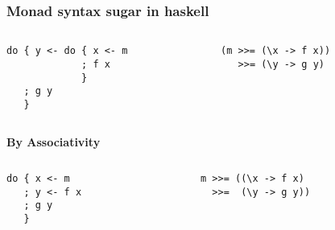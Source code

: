 \documentclass{beamer}
\begin{document}
\begin{frame}[fragile]
\frametitle{Monad syntax sugar in haskell}
\vspace{-0.5cm}
\begin{columns}[t]
  \begin{column}{5cm}
\begin{lstlisting}
do { y <- do { x <- m
             ; f x
             }
   ; g y 
   }
\end{lstlisting}
  \end{column}
  \begin{column}{5cm}
\begin{lstlisting}
(m >>= (\x -> f x)) 
   >>= (\y -> g y)
\end{lstlisting}
  \end{column}
\end{columns}

\pause

\begin{center}
\textbf{By Associativity}
\end{center}

\vspace{-0.5cm}
\begin{columns}[t]
  \begin{column}{5cm}
{
\begin{lstlisting}
do { x <- m
   ; y <- f x
   ; g y 
   }
\end{lstlisting}
}
  \end{column}
  \begin{column}{5cm}
{
\begin{lstlisting}
m >>= ((\x -> f x) 
  >>=  (\y -> g y))
\end{lstlisting}
}
  \end{column}
\end{columns}
\end{frame}
\end{document}
